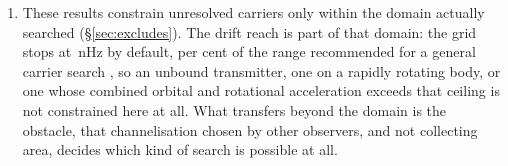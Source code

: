 \begin{enumerate}[leftmargin=1.6em,itemsep=4pt,topsep=4pt,parsep=0pt]
\item These results constrain unresolved carriers only within the domain
actually searched (\S\ref{sec:excludes}). The drift reach is part of that
domain: the grid stops at \DriftCeilLo\,nHz by default, \AccelSheikhPct{} per cent of
the range recommended for a general carrier search \citep{Sheikh2019}, so an
unbound transmitter, one on a rapidly rotating body, or one whose combined
orbital and rotational acceleration exceeds that ceiling is not constrained
here at all. What transfers beyond the domain is the
obstacle, that channelisation chosen by other observers, and not
collecting area, decides which kind of search is possible at all.

\end{enumerate}
